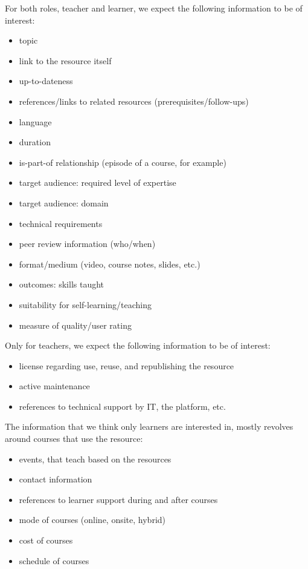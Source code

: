 \documentclass{scrartcl}
\begin{document}
For both roles, teacher and learner, we expect the following information to be of interest:
\begin{itemize}
\item topic
\item link to the resource itself
\item up-to-dateness
\item references/links to related resources (prerequisites/follow-ups)
\item language
\item duration
\item is-part-of relationship (episode of a course, for example)
\item target audience: required level of expertise
\item target audience: domain
\item technical requirements
\item peer review information (who/when)
\item format/medium (video, course notes, slides, etc.)
\item outcomes: skills taught
\item suitability for self-learning/teaching
\item measure of quality/user rating
\end{itemize}

Only for teachers, we expect the following information to be of interest:
\begin{itemize}
\item license regarding use, reuse, and republishing the resource
\item active maintenance
\item references to technical support by IT, the platform, etc.
\end{itemize}

The information that we think only learners are interested in, mostly revolves around courses that use the resource:
\begin{itemize}
\item events, that teach based on the resources
\item contact information
\item references to learner support during and after courses
\item mode of courses (online, onsite, hybrid)
\item cost of courses
\item schedule of courses
\end{itemize}
\end{document}
